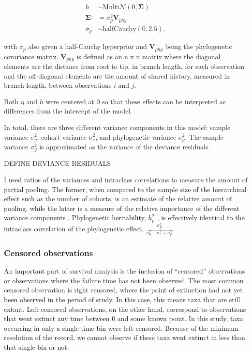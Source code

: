\documentclass[12pt,letterpaper]{article}
\begin{document}
\begin{align*}
  h &\sim \mathrm{Multi}\mathcal{N}(0, \mathbf{\Sigma}) \\
  \mathbf{\Sigma} &= \sigma_{p}^{2} \mathbf{V}_{phy} \\
  \sigma_{p} &\sim \mathrm{halfCauchy}(0, 2.5),
\end{align*}
 
with \(\sigma_{p}\) also given a half-Cauchy hyperprior and \(\mathbf{V}_{phy}\) being the phylogenetic covariance matrix. \(\mathbf{V}_{phy}\) is defined as an n x n matrix where the diagonal elements are the distance from root to tip, in branch length, for each observation and the off-diagonal elements are the amount of shared history, measured in branch length, between observations \(i\) and \(j\).

Both \(\eta\) and \(h\) were centered at 0 so that these effects can be interpreted as differences from the intercept of the model. 

In total, there are three different variance components in this model: sample variance \(\sigma_{y}^{2}\), cohort variance \(\sigma_{c}^{2}\), and phylogenetic variance \(\sigma_{p}^{2}\). The sample variance \(\sigma_{y}^{2}\) is approximated as the variance of the deviance residuals.

\uppercase{define deviance residuals}

I used ratios of the variances and intraclass correlations to measure the amount of partial pooling. The former, when compared to the sample size of the hierarchical effect such as the number of cohorts, is an estimate of the relative amount of pooling, while the latter is a measure of the relative importance of the different variance components \citep{Gelman2007}. Phylogenetic heritability, \(h_{p}^{2}\) \citet{Housworth2004}, is effectively identical to the intraclass correlation of the phylogenetic effect, \(\frac{\sigma_{p}^{2}}{\sigma_{y}^{2} + \sigma_{c}^{2} + \sigma_{p}^{2}}\).



\subsubsection{Censored observations}

An important part of survival analysis is the inclusion of ``censored'' observations \citep{Ibrahim2001,Kleinbaum2005} or observations where the failure time has not been observed. The most common censored observation is right censored, where the point of extinction had not yet been observed in the period of study. In this case, this means taxa that are still extant. Left censored observations, on the other hand, correspond to observations that went extinct any time between 0 and some known point. In this study, taxa occurring in only a single time bin were left censored. Because of the minimum resolution of the record, we cannot observe if these taxa went extinct in less than that single bin or not. 
\end{document}
